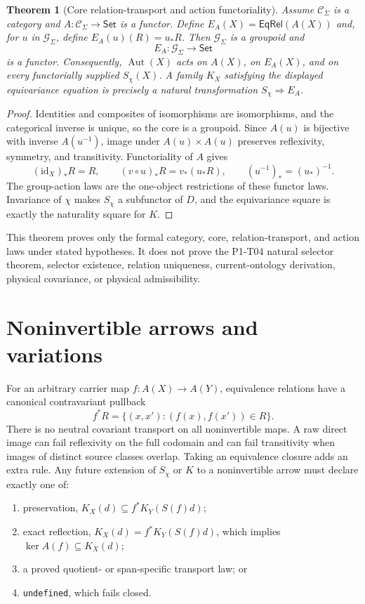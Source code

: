 \documentclass[11pt]{article}
\newtheorem{theorem}{Theorem}
\newcommand{\Aut}{\operatorname{Aut}}
\newcommand{\EqRel}{\mathsf{EqRel}}
\newcommand{\Set}{\mathsf{Set}}
\begin{document}
\begin{theorem}[Core relation-transport and action functoriality]
Assume \(\mathcal C_{\Sigma}\) is a category and
\(A:\mathcal C_{\Sigma}\to\Set\) is a functor. Define
\(E_A(X)=\EqRel(A(X))\) and, for \(u\) in
\(\mathcal G_{\Sigma}\), define \(E_A(u)(R)=u_*R\). Then
\(\mathcal G_{\Sigma}\) is a groupoid and
\[
E_A:\mathcal G_{\Sigma}\longrightarrow\Set
\]
is a functor. Consequently, \(\Aut(X)\) acts on \(A(X)\), on
\(E_A(X)\), and on every functorially supplied \(S_{\chi}(X)\). A family
\(K_X\) satisfying the displayed equivariance equation is precisely a natural
transformation \(S_{\chi}\Rightarrow E_A\).
\end{theorem}

\begin{proof}
Identities and composites of isomorphisms are isomorphisms, and the categorical
inverse is unique, so the core is a groupoid. Since \(A(u)\) is bijective with
inverse \(A(u^{-1})\), image under \(A(u)\times A(u)\) preserves reflexivity,
symmetry, and transitivity. Functoriality of \(A\) gives
\[
(\mathrm{id}_X)_*R=R,
\qquad
(v\circ u)_*R=v_*(u_*R),
\qquad
(u^{-1})_*=(u_*)^{-1}.
\]
The group-action laws are the one-object restrictions of these functor laws.
Invariance of \(\chi\) makes \(S_{\chi}\) a subfunctor of \(D\), and the
equivariance square is exactly the naturality square for \(K\).
\end{proof}

This theorem proves only the formal category, core, relation-transport, and
action laws under stated hypotheses. It does not prove the P1-T04 natural
selector theorem, selector existence, relation uniqueness, current-ontology
derivation, physical covariance, or physical admissibility.

\section{Noninvertible arrows and variations}

For an arbitrary carrier map \(f:A(X)\to A(Y)\), equivalence relations have a
canonical contravariant pullback
\[
f^*R=\{(x,x'):(f(x),f(x'))\in R\}.
\]
There is no neutral covariant transport on all noninvertible maps. A raw direct
image can fail reflexivity on the full codomain and can fail transitivity when
images of distinct source classes overlap. Taking an equivalence closure adds
an extra rule. Any future extension of \(S_{\chi}\) or \(K\) to a
noninvertible arrow must declare exactly one of:
\begin{enumerate}[label=(N\arabic*)]
  \item preservation,
  \(K_X(d)\subseteq f^*K_Y(S(f)d)\);
  \item exact reflection,
  \(K_X(d)=f^*K_Y(S(f)d)\), which implies
  \(\ker A(f)\subseteq K_X(d)\);
  \item a proved quotient- or span-specific transport law; or
  \item \texttt{undefined}, which fails closed.
\end{enumerate}
\end{document}
